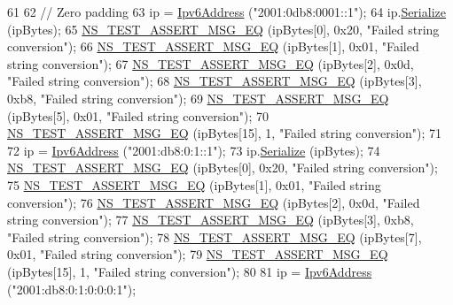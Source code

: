 \begin{DoxyCode}
61 
62   \textcolor{comment}{// Zero padding}
63   ip = \hyperlink{classns3_1_1Ipv6Address}{Ipv6Address} (\textcolor{stringliteral}{"2001:0db8:0001::1"});
64   ip.\hyperlink{classns3_1_1Ipv6Address_adf5b453892de2893a371380ab299db88}{Serialize} (ipBytes);
65   \hyperlink{group__testing_ga2a9d78cffb3db8e867c35fff0b698cf5}{NS\_TEST\_ASSERT\_MSG\_EQ} (ipBytes[0], 0x20, \textcolor{stringliteral}{"Failed string conversion"});
66   \hyperlink{group__testing_ga2a9d78cffb3db8e867c35fff0b698cf5}{NS\_TEST\_ASSERT\_MSG\_EQ} (ipBytes[1], 0x01, \textcolor{stringliteral}{"Failed string conversion"});
67   \hyperlink{group__testing_ga2a9d78cffb3db8e867c35fff0b698cf5}{NS\_TEST\_ASSERT\_MSG\_EQ} (ipBytes[2], 0x0d, \textcolor{stringliteral}{"Failed string conversion"});
68   \hyperlink{group__testing_ga2a9d78cffb3db8e867c35fff0b698cf5}{NS\_TEST\_ASSERT\_MSG\_EQ} (ipBytes[3], 0xb8, \textcolor{stringliteral}{"Failed string conversion"});
69   \hyperlink{group__testing_ga2a9d78cffb3db8e867c35fff0b698cf5}{NS\_TEST\_ASSERT\_MSG\_EQ} (ipBytes[5], 0x01, \textcolor{stringliteral}{"Failed string conversion"});
70   \hyperlink{group__testing_ga2a9d78cffb3db8e867c35fff0b698cf5}{NS\_TEST\_ASSERT\_MSG\_EQ} (ipBytes[15], 1, \textcolor{stringliteral}{"Failed string conversion"});
71 
72   ip = \hyperlink{classns3_1_1Ipv6Address}{Ipv6Address} (\textcolor{stringliteral}{"2001:db8:0:1::1"});
73   ip.\hyperlink{classns3_1_1Ipv6Address_adf5b453892de2893a371380ab299db88}{Serialize} (ipBytes);
74   \hyperlink{group__testing_ga2a9d78cffb3db8e867c35fff0b698cf5}{NS\_TEST\_ASSERT\_MSG\_EQ} (ipBytes[0], 0x20, \textcolor{stringliteral}{"Failed string conversion"});
75   \hyperlink{group__testing_ga2a9d78cffb3db8e867c35fff0b698cf5}{NS\_TEST\_ASSERT\_MSG\_EQ} (ipBytes[1], 0x01, \textcolor{stringliteral}{"Failed string conversion"});
76   \hyperlink{group__testing_ga2a9d78cffb3db8e867c35fff0b698cf5}{NS\_TEST\_ASSERT\_MSG\_EQ} (ipBytes[2], 0x0d, \textcolor{stringliteral}{"Failed string conversion"});
77   \hyperlink{group__testing_ga2a9d78cffb3db8e867c35fff0b698cf5}{NS\_TEST\_ASSERT\_MSG\_EQ} (ipBytes[3], 0xb8, \textcolor{stringliteral}{"Failed string conversion"});
78   \hyperlink{group__testing_ga2a9d78cffb3db8e867c35fff0b698cf5}{NS\_TEST\_ASSERT\_MSG\_EQ} (ipBytes[7], 0x01, \textcolor{stringliteral}{"Failed string conversion"});
79   \hyperlink{group__testing_ga2a9d78cffb3db8e867c35fff0b698cf5}{NS\_TEST\_ASSERT\_MSG\_EQ} (ipBytes[15], 1, \textcolor{stringliteral}{"Failed string conversion"});
80 
81   ip = \hyperlink{classns3_1_1Ipv6Address}{Ipv6Address} (\textcolor{stringliteral}{"2001:db8:0:1:0:0:0:1"});

\end{DoxyCode}
